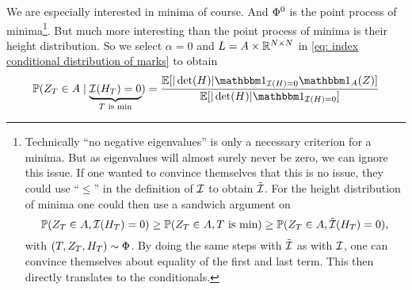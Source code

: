 We are especially interested in minima of course. And \(\Phi^0\) is the point
process of minima\footnote{
	Technically ``no negative eigenvalues'' is only a necessary criterion for a
	minima. But as eigenvalues will almost surely never be zero, we can
	ignore this issue. If one wanted to convince themselves that this is
	no issue, they could use ``\(\le\)'' in the definition of \(\mathcal{I}\) to
	obtain \(\tilde{\mathcal{I}}\). For the height distribution of minima one
	could then use a sandwich argument on
	\[
		\mathbb{P}(Z_T\in A, \mathcal{I}(H_T) = 0)
		\ge \mathbb{P}(Z_T\in A, T\text{ is min})
		\ge \mathbb{P}(Z_T\in A, \tilde{\mathcal{I}}(H_T) = 0),
	\]
	with \((T,Z_T,H_T)\sim \Phi\).
	By doing the same steps with \(\tilde{\mathcal{I}}\) as with
	\(\mathcal{I}\), one can convince themselves about equality of the first and
	last term. This then directly translates to the conditionals.
}.
But much more interesting than the point process of minima is
their height distribution. So we select \(\alpha=0\) and \(L=A\times
\mathbb{R}^{N\times N}\) in \eqref{eq: index conditional distribution of marks}
to obtain
\[
	\Pr(Z_T \in A \mid \underbrace{\negEV(H_T)=0}_{T\text{ is min}})
	= \frac{\E[|\det(H)|\ind_{\negEV(H)=0}\ind_A(Z)]}{\E[|\det(H)|\ind_{\negEV(H)=0}]}
\]

